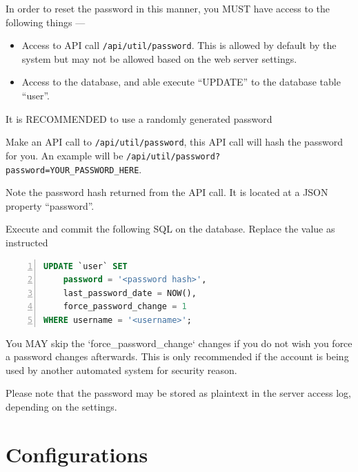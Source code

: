 \documentclass[12pt]{report}
\begin{document}
    In order to reset the password in this manner, you MUST have access to the following things ---
    \begin{itemize}
        \item Access to API call \texttt{/api/util/password}.
        This is allowed by default by the system but may not be allowed based on the web server settings.
        \item Access to the database, and able execute ``UPDATE'' to the database table ``user''.
    \end{itemize}

    \begin{infobox}
        It is RECOMMENDED to use a randomly generated password
    \end{infobox}

     Make an API call to \texttt{/api/util/password}, this API call will hash the password for you.
    An example will be \texttt{/api/util/password?password=YOUR\_PASSWORD\_HERE}.
    
     Note the password hash returned from the API call.
    It is located at a JSON property ``password''.

     Execute and commit the following SQL on the database.
    Replace the value as instructed
    \begin{lstlisting}[language=SQL,
           basicstyle=\ttfamily,
           numbers=left,
           numberstyle=\tiny
    ]
UPDATE `user` SET
    password = '<password hash>',
    last_password_date = NOW(),
    force_password_change = 1
WHERE username = '<username>';
    \end{lstlisting}

    \begin{infobox}
        You MAY skip the `force\_password\_change` changes if you do not wish you force a password changes afterwards.
        This is only recommended if the account is being used by another automated system for security reason.

        Please note that the password may be stored as plaintext in the server access log, depending on the settings.
    \end{infobox}

    \chapter{Configurations}\label{ch:configurations}
\end{document}
